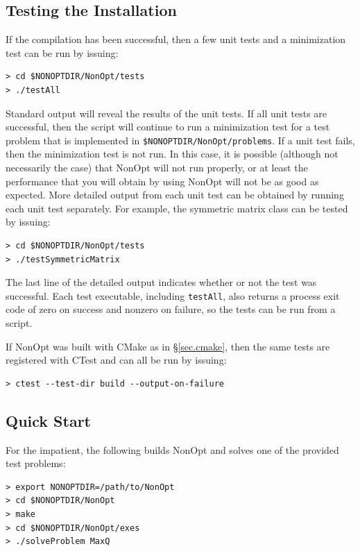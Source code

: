 \documentclass{article}
\begin{document}
\subsection{Testing the Installation}

If the compilation has been successful, then a few unit tests and a minimization test can be run by issuing:

\begin{verbatim}
> cd $NONOPTDIR/NonOpt/tests
> ./testAll
\end{verbatim}

Standard output will reveal the results of the unit tests. If all unit tests are successful, then the script will continue to run a minimization test for a test problem that is implemented in \texttt{\$NONOPTDIR/NonOpt/problems}.  If a unit test fails, then the minimization test is not run.  In this case, it is possible (although not necessarily the case) that NonOpt will not run properly, or at least the performance that you will obtain by using NonOpt will not be as good as expected.  More detailed output from each unit test can be obtained by running each unit test separately. For example, the symmetric matrix class can be tested by issuing:

\begin{verbatim}
> cd $NONOPTDIR/NonOpt/tests
> ./testSymmetricMatrix
\end{verbatim}

The last line of the detailed output indicates whether or not the test was successful.  Each test executable, including \texttt{testAll}, also returns a process exit code of zero on success and nonzero on failure, so the tests can be run from a script.

If NonOpt was built with CMake as in \S\ref{sec.cmake}, then the same tests are registered with CTest and can all be run by issuing:

\begin{verbatim}
> ctest --test-dir build --output-on-failure
\end{verbatim}

\subsection{Quick Start}

For the impatient, the following builds NonOpt and solves one of the provided test problems:

\begin{verbatim}
> export NONOPTDIR=/path/to/NonOpt
> cd $NONOPTDIR/NonOpt
> make
> cd $NONOPTDIR/NonOpt/exes
> ./solveProblem MaxQ
\end{verbatim}
\end{document}
